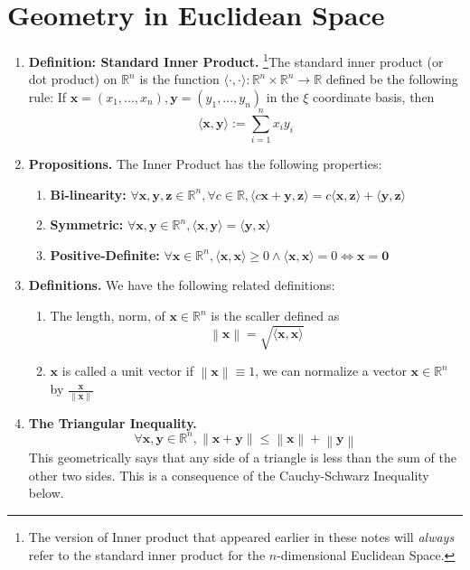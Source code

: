 \documentclass[oneside, 12pt]{book}
\newcommand{\settag}[1]{\renewcommand{\theenumi}{#1}}
\newcommand{\R}{\mathbb{R}}
\newcommand{\tbf}[1]{\textbf{#1}}
\newcommand{\tit}[1]{\textit{#1}}
\newcommand{\norm}[1]{\left\lVert#1\right\rVert}
\newcommand{\para}[1]{\item \tbf{#1}}
\newcommand{\vx}{\mathbf{x}}
\newcommand{\vy}{\mathbf{y}}
\newcommand{\vz}{\mathbf{z}}
\newcommand{\vzero}{\mathbf{0}}
\begin{document}
\section{Geometry in Euclidean Space}
\begin{enumerate}
    \settag{4.3.1}
    \para{Definition: Standard Inner Product.} \footnote{The version of Inner product that appeared earlier in these notes will \tit{always} refer to the standard inner product for the $n$-dimensional Euclidean Space.}The standard inner product (or dot product) on $\R^n$ is the function
    $\langle\cdot,\cdot\rangle: \R^n \times \R^n \rightarrow{} \R$
    defined be the following rule: If $\vx = (x_1,...,x_n), \vy = (y_1,...,y_n)$ in the $\xi$ coordinate basis, then 
    \begin{equation*}
        \langle\vx,\vy \rangle := \sum_{i=1}^n x_iy_i
    \end{equation*}
    
    \settag{4.3.2}
    \para{Propositions.} The Inner Product has the following properties:
    \begin{enumerate}
        \item \textbf{Bi-linearity:} $\forall \vx, \vy, \vz \in \R^n, \forall c\in \R, \langle c\vx + \vy,\vz\rangle = c\langle\vx,\vz\rangle + \langle \vy,\vz \rangle$
        \item \textbf{Symmetric:} $\forall \vx, \vy\in\R^n, \langle \vx,\vy\rangle = \langle \vy,\vx \rangle$
        \item \textbf{Positive-Definite:} $\forall \vx \in \R^n, \langle \vx,\vx \rangle \geq 0 \land \langle \vx,\vx \rangle = 0 \iff \vx = \vzero$
    \end{enumerate}
    
    \settag{4.3.3}
    \para{Definitions.} We have the following related definitions:
    \begin{enumerate}
        \item The length, norm, of $\vx \in \R^n$ is the scaller defined as
        \begin{equation*}
            \norm{\vx} = \sqrt{\langle\vx,\vx\rangle}
        \end{equation*}
        \item $\vx$ is called a unit vector if $\norm{\vx} \equiv 1$, we can normalize a vector $\vx\in \R^n$ by $\frac{\vx}{\norm{\vx}}$
    \end{enumerate}
    
    \settag{4.3.4-(1)}
    \para{The Triangular Inequality.}
    \begin{equation*}
        \forall \vx, \vy \in \R^n, \norm{\vx + \vy}\leq \norm{\vx} + \norm{\vy}
    \end{equation*}
    This geometrically says that any side of a triangle is less than the sum of the other two sides. This is a consequence of the Cauchy-Schwarz Inequality below.
    

\end{enumerate}
\end{document}
